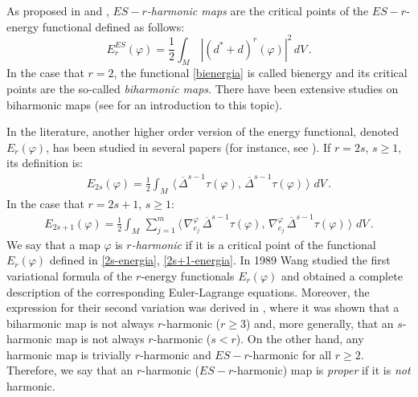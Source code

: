 \documentclass[11pt]{amsart}
\theoremstyle{plain}
\theoremstyle{definition}
\numberwithin{equation}{section}
\numberwithin{equation}{section}
\begin{document}
As proposed in \cite{EL83} and \cite{ES}, {\it $ES-r$-harmonic maps} are the critical points of the $ES-r$-energy functional defined as follows:
\begin{equation}\label{bienergia}
    E^{ES}_r(\varphi)=\frac{1}{2}\int_{M}\,|(d^*+d)^r (\varphi)|^2\,dV\, .
\end{equation}
In the case that $r=2$, the functional \eqref{bienergia} is called bienergy and its critical points are the so-called \textit{biharmonic maps}. There have been extensive studies on biharmonic maps (see \cite{Jiang, SMCO} for an introduction to this topic). 

In the literature, another higher order version of the energy functional, denoted $E_r(\varphi)$, has been studied in several papers (for instance, see \cite{Maeta1, Maeta2, Maeta3, Maeta4, Mont-Ratto1, Mont-Ratto2, Na-Ura, Wang, Wang2}). If $r=2s$, $s \geq 1$, its definition is:
\begin{equation}\label{2s-energia}
\begin{split}
E_{2s}(\varphi)
= \frac{1}{2} \int_M \, \langle \,\overline{\Delta}^{s-1}\tau(\varphi), \,\overline{\Delta}^{s-1}\tau(\varphi)\,\rangle \, \,dV\,.
\end{split}
\end{equation}
In the case that $r=2s+1$, $s\geq 1$:
\begin{equation}\label{2s+1-energia}
\begin{split}
E_{2s+1}(\varphi)
= \frac{1}{2} \int_M \,\sum_{j=1}^m \langle\,\nabla^\varphi_{e_j}\, \overline{\Delta}^{s-1}\tau(\varphi), \,\nabla^\varphi_{e_j}\,\overline{\Delta}^{s-1}\tau(\varphi)\, \rangle \, \,dV \,.
\end{split}
\end{equation}
We say that a map $\varphi$ is \textit{$r$-harmonic} if it is a critical point of the functional $E_r(\varphi)$ defined in \eqref{2s-energia}, \eqref{2s+1-energia}. 
In 1989 Wang \cite{Wang} studied the first variational formula of the $r$-energy functionals $E_r(\varphi)$ and obtained a complete description of the corresponding Euler-Lagrange equations. Moreover, the expression for their second variation was derived in \cite{Maeta3}, where it was shown that a biharmonic map is not always $r$-harmonic ($r \geq 3$) and, more generally, that an $s$-harmonic map is not always $r$-harmonic ($s < r$). On the other hand, any harmonic map is trivially $r$-harmonic and $ES-r$-harmonic for all $r\geq 2$. Therefore, we say that an $r$-harmonic ($ES-r$-harmonic) map is {\it proper} if it is \textit{not} harmonic.
\end{document}
